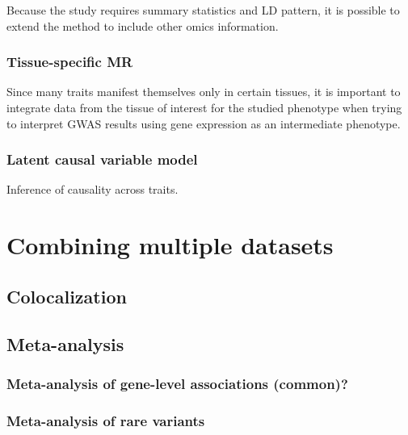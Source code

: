 \documentclass[
]{book}
\begin{document}
Because the study requires summary statistics and LD pattern, it is possible to extend the method to include other omics information.

\hypertarget{tissue-specific-mr}{%
\subsection{Tissue-specific MR}\label{tissue-specific-mr}}

Since many traits manifest themselves only in certain tissues, it is important to integrate data from the tissue of interest for the studied phenotype when trying to interpret GWAS results using gene expression as an intermediate phenotype.

\hypertarget{latent-causal-variable-model}{%
\subsection{Latent causal variable model}\label{latent-causal-variable-model}}

Inference of causality across traits.

\hypertarget{combining-multiple-datasets}{%
\chapter{Combining multiple datasets}\label{combining-multiple-datasets}}

\hypertarget{colocalization}{%
\section{Colocalization}\label{colocalization}}

\hypertarget{meta-analysis}{%
\section{Meta-analysis}\label{meta-analysis}}

\hypertarget{meta-analysis-of-gene-level-associations-common}{%
\subsection{Meta-analysis of gene-level associations (common)?}\label{meta-analysis-of-gene-level-associations-common}}

\hypertarget{meta-analysis-of-rare-variants}{%
\subsection{Meta-analysis of rare variants}\label{meta-analysis-of-rare-variants}}
\end{document}
